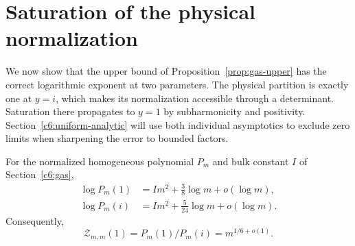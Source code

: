 \section{Saturation of the physical normalization}\label{c6:subheading-09}


We now show that the upper bound of Proposition~\ref{prop:gas-upper}
has the correct logarithmic exponent at two parameters. The physical
partition is exactly one at \(y=i\), which makes its normalization
accessible through a determinant. Saturation there propagates to
\(y=1\) by subharmonicity and positivity. Section~\ref{c6:uniform-analytic}
will use both individual asymptotics to exclude zero limits when
sharpening the error to bounded factors.

\begin{auxproposition}
For the normalized homogeneous polynomial \(P_m\) and bulk constant
\(I\) of Section~\ref{c6:gas},
\begin{equation}\label{eq:gas-individual-saturation}
\begin{split}
 \log P_m(1)&=Im^2+\frac38\log m+o(\log m),\\
 \log P_m(i)&=Im^2+\frac5{24}\log m+o(\log m).
\end{split}
\end{equation}
Consequently,
\begin{equation}\label{eq:saturation-nesting}
 \mathcal Z_{m,m}(1)=P_m(1)/P_m(i)=m^{1/6+o(1)}.
\end{equation}
\end{auxproposition}

